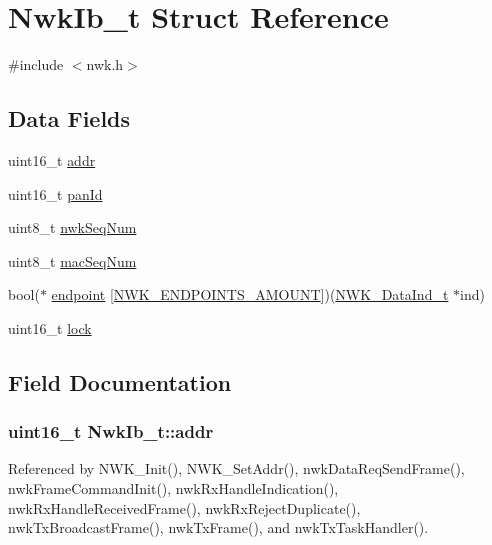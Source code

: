 \hypertarget{struct_nwk_ib__t}{\section{Nwk\-Ib\-\_\-t Struct Reference}
\label{struct_nwk_ib__t}
}


{\ttfamily \#include $<$nwk.\-h$>$}

\subsection*{Data Fields}
\begin{DoxyCompactItemize}
\item 
uint16\-\_\-t \hyperlink{struct_nwk_ib__t_a93d41c50b1fc0979fdcb5b31525b64a3}{addr}
\item 
uint16\-\_\-t \hyperlink{struct_nwk_ib__t_a421fbf7eaa40857b90ed458d8648e774}{pan\-Id}
\item 
uint8\-\_\-t \hyperlink{struct_nwk_ib__t_a7922253056ebd63dd2c8fce7164e71d6}{nwk\-Seq\-Num}
\item 
uint8\-\_\-t \hyperlink{struct_nwk_ib__t_a17330655f00d16fb7a4732d55c8ce646}{mac\-Seq\-Num}
\item 
bool($\ast$ \hyperlink{struct_nwk_ib__t_a6884c7984dc4010d48772d84fd9b83bc}{endpoint} \mbox{[}\hyperlink{nwk_8h_aeed58979d2ea2db91c59f556223da4ae}{N\-W\-K\-\_\-\-E\-N\-D\-P\-O\-I\-N\-T\-S\-\_\-\-A\-M\-O\-U\-N\-T}\mbox{]})(\hyperlink{struct_n_w_k___data_ind__t}{N\-W\-K\-\_\-\-Data\-Ind\-\_\-t} $\ast$ind)
\item 
uint16\-\_\-t \hyperlink{struct_nwk_ib__t_a577806f9b0e40c84e2c8235b3479f759}{lock}
\end{DoxyCompactItemize}


\subsection{Field Documentation}
\hypertarget{struct_nwk_ib__t_a93d41c50b1fc0979fdcb5b31525b64a3}{
\subsubsection[{addr}]{\setlength{\rightskip}{0pt plus 5cm}uint16\-\_\-t Nwk\-Ib\-\_\-t\-::addr}}\label{struct_nwk_ib__t_a93d41c50b1fc0979fdcb5b31525b64a3}


Referenced by N\-W\-K\-\_\-\-Init(), N\-W\-K\-\_\-\-Set\-Addr(), nwk\-Data\-Req\-Send\-Frame(), nwk\-Frame\-Command\-Init(), nwk\-Rx\-Handle\-Indication(), nwk\-Rx\-Handle\-Received\-Frame(), nwk\-Rx\-Reject\-Duplicate(), nwk\-Tx\-Broadcast\-Frame(), nwk\-Tx\-Frame(), and nwk\-Tx\-Task\-Handler().

